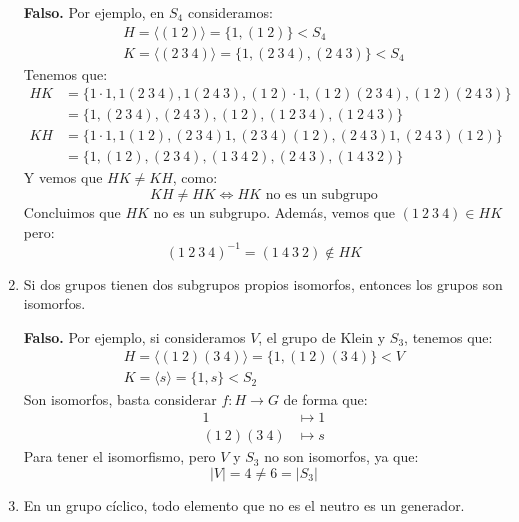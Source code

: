 \documentclass[12pt]{article}
\begin{document}
\begin{ejercicio}
\begin{enumerate}
                \textbf{Falso.} Por ejemplo, en $S_4$ consideramos:
                \begin{gather*}
                    H = \langle (1\ 2) \rangle = \{1, (1\ 2)\} < S_4 \\
                    K = \langle (2\ 3\ 4) \rangle  = \{1, (2\ 3\ 4), (2\ 4\ 3)\} < S_4
                \end{gather*}
                Tenemos que:
                \begin{align*}
                    HK &= \{1\cdot 1, 1(2\ 3\ 4), 1(2\ 4\ 3), (1\ 2)\cdot 1, (1\ 2)(2\ 3\ 4), (1\ 2)(2\ 4\ 3)\} \\
                       &= \{1, (2\ 3\ 4), (2\ 4\ 3), (1\ 2), (1\ 2\ 3\ 4), (1\ 2\ 4\ 3)\} \\
                    KH &= \{1\cdot 1, 1(1\ 2), (2\ 3\ 4)1, (2\ 3\ 4)(1\ 2), (2\ 4\ 3)1, (2\ 4\ 3)(1\ 2)\} \\
                       &= \{1, (1\ 2), (2\ 3\ 4), (1\ 3\ 4\ 2), (2\ 4\ 3), (1\ 4\ 3\ 2)\}
                \end{align*}
                Y vemos que $HK\neq KH$, como:
                \begin{equation*}
                    KH\neq HK \Longleftrightarrow HK \text{\ no es un subgrupo}
                \end{equation*}
                Concluimos que $HK$ no es un subgrupo. Además, vemos que $(1\ 2\ 3\ 4)\in HK$ pero:
                \begin{equation*}
                    {(1\ 2\ 3\ 4)}^{-1} = (1\ 4\ 3\ 2) \notin HK
                \end{equation*}

            \item Si dos grupos tienen dos subgrupos propios isomorfos, entonces los grupos son isomorfos.

                \textbf{Falso.} Por ejemplo, si consideramos $V$, el grupo de Klein y $S_3$, tenemos que:
                \begin{gather*}
                    H = \langle (1\ 2)(3\ 4) \rangle = \{1, (1\ 2)(3\ 4)\} < V \\
                    K = \langle s \rangle = \{1, s\} < S_2
                \end{gather*}
                Son isomorfos, basta considerar $f:H\to G$ de forma que:
                \begin{align*}
                    1 &\longmapsto 1 \\
                    (1\ 2)(3\ 4) &\longmapsto s
                \end{align*}
                Para tener el isomorfismo, pero $V$ y $S_3$ no son isomorfos, ya que:
                \begin{equation*}
                    |V| = 4 \neq 6 = |S_3|
                \end{equation*}
            \item En un grupo cíclico, todo elemento que no es el neutro es un generador.


\end{enumerate}
\end{ejercicio}
\end{document}
